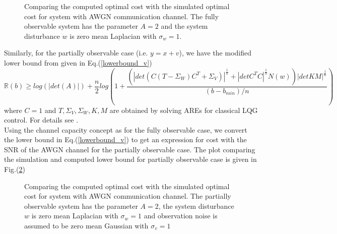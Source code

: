 \documentclass[12pt]{caltech_thesis_progress2}
\begin{document}
		\begin{figure}[H]
			  \centering
			 \tiny{	
			}
			  \caption{Comparing the computed optimal cost with the simulated optimal cost for system with AWGN communication channel. The fully observable system has the parameter $A = 2$ and the system disturbance $w$ is zero mean Laplacian with $\sigma_{w} = 1$.}
			 \label{lowerbound_vs_laplace}
		\end{figure}	
		 Similarly, for the partially observable case (i.e. $y = x + v$), we have the modified lower bound from \cite{victoria} given in Eq.(\ref{lowerbound_v})
			  \begin{equation}
			  \mathbb{R}(b) \geq log(|det(A)|) + \frac{n}{2} log \left( 1 + \frac{\left(|det(C(T-\Sigma_{W})C^{T} + \Sigma_{V})|^{\frac{1}{n}} + |detC^{T}C|^{\frac{1}{n}}N(w)\right)|det KM|^{\frac{1}{n}}}{(b-b_{min})/n}\right)
			  \label{lowerbound_v}
			  \end{equation}
			  where $C=1$ and $T,\Sigma_{V}, \Sigma_{W}, K, M$ are obtained by solving AREs for classical LQG control. For details see \cite{victoria}.\\
			  Using the channel capacity concept as for the fully observable case, we convert the lower bound in Eq.(\ref{lowerbound_v}) to get an expression for cost with the SNR of the AWGN channel for the partially observable case. The plot comparing the simulation and computed lower bound for partially observable case is given in Fig.(\ref{lowerbound_vs_laplace_v})
			  \begin{figure}[H]
			  \centering
			 \tiny{	
			}
			  \caption{Comparing the computed optimal cost with the simulated optimal cost for system with AWGN communication channel. The partially observable system has the parameter $A = 2$, the system disturbance $w$ is zero mean Laplacian with $\sigma_{w} = 1$ and observation noise is assumed to be zero mean Gaussian with $\sigma_{v} = 1$}
			 \label{lowerbound_vs_laplace_v}
		\end{figure}	
\end{document}

